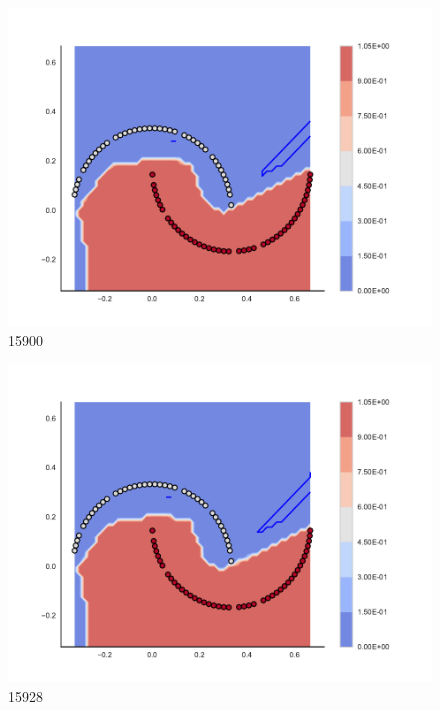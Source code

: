 \begin{subfigure}[b]{0.09\textwidth}
    \includegraphics[clip, trim=2.35cm 1.75cm 4.5cm 0cm,width=\textwidth]{img/convergence/15900.pdf}
    \caption{15900}
    \label{fig:convergence_15900}
\end{subfigure}
%
\begin{subfigure}[b]{0.09\textwidth}
    \includegraphics[clip, trim=2.35cm 1.75cm 4.5cm 0cm,width=\textwidth]{img/convergence/15928.pdf}
    \caption{15928}
    \label{fig:convergence_15928}
\end{subfigure}
%
